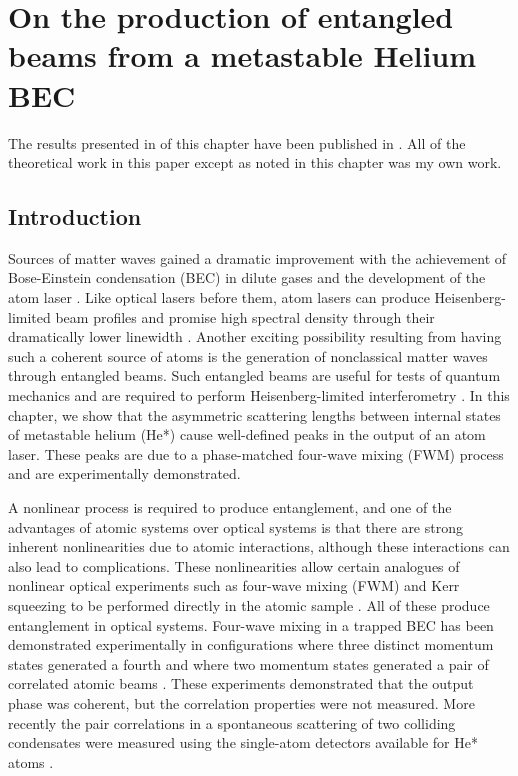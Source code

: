 \chapter{On the production of entangled beams from a metastable Helium BEC}
\label{Peaks}
\graphicspath{{Figures/Peaks/}{Figures/Common/}}

The results presented in  of this chapter have been published in \citet{Dall:2009}. All of the theoretical work in this paper except as noted in this chapter was my own work.

\section{Introduction}
Sources of matter waves gained a dramatic improvement with the achievement of Bose-Einstein condensation (BEC) in dilute gases and the development of the atom laser \citep{Anderson:1995vn,Mewes:1997}. Like optical lasers before them, atom lasers can produce Heisenberg-limited beam profiles \citep{Busch:2002zr,Riou:2006uq} and promise high spectral density through their dramatically lower linewidth \citep{Wiseman:1997ba}. Another exciting possibility resulting from having such a coherent source of atoms is the generation of nonclassical matter waves through entangled beams. Such entangled beams are useful for tests of quantum mechanics and are required to perform Heisenberg-limited interferometry \citep{Dowling:1998,Reid:1988}. In this chapter, we show that the asymmetric scattering lengths between internal states of metastable helium (He*) cause well-defined peaks in the output of an atom laser. These peaks are due to a phase-matched four-wave mixing (FWM) process and are experimentally demonstrated.

A nonlinear process is required to produce entanglement, and one of the advantages of atomic systems over optical systems is that there are strong inherent nonlinearities due to atomic interactions, although these interactions can also lead to complications. These nonlinearities allow certain analogues of nonlinear optical experiments such as four-wave mixing (FWM) and Kerr squeezing to be performed directly in the atomic sample \citep{WallsMilburn}. All of these produce entanglement in optical systems. Four-wave mixing in a trapped BEC has been demonstrated experimentally in configurations where three distinct momentum states generated a fourth \citep{Deng:1999qy} and where two momentum states generated a pair of correlated atomic beams \citep{Vogels:2002}. These experiments demonstrated that the output phase was coherent, but the correlation properties were not measured. More recently the pair correlations in a spontaneous scattering of two colliding condensates were measured using the single-atom detectors available for He* atoms \citep{Perrin:2007}.

